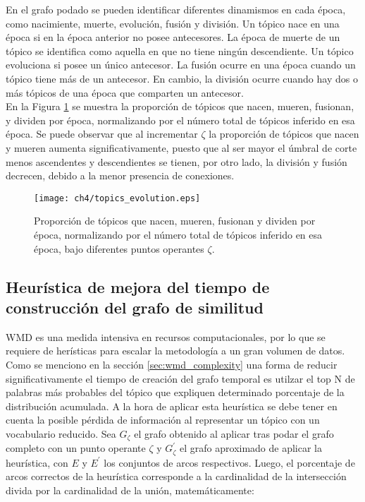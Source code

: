 En el grafo podado se pueden identificar diferentes dinamismos en cada época, como nacimiente, muerte, evolución, fusión y división. Un tópico nace en una época si en la época anterior no posee antecesores. La época de muerte de un tópico se identifica como aquella en que no tiene ningún descendiente. Un tópico evoluciona si posee un único antecesor. La fusión ocurre en una época cuando un tópico tiene más de un antecesor. En cambio, la división ocurre cuando hay dos o más tópicos de una época que comparten un antecesor.\\

En la Figura \ref{img:topics_evolution} se muestra la proporción de tópicos que nacen, mueren, fusionan, y dividen por época, normalizando por el número total de tópicos inferido en esa época. Se puede observar que al incrementar $\zeta$ la proporción de tópicos que nacen y mueren aumenta significativamente, puesto que al ser mayor el úmbral de corte menos ascendentes y descendientes se tienen, por otro lado, la división y fusión decrecen, debido a la menor presencia de conexiones.

\begin{figure}
    \centering
    \texttt{[image: ch4/topics\_evolution.eps]}
    \caption{Proporción de tópicos que nacen, mueren, fusionan y dividen por época, normalizando por el número total de tópicos inferido en esa época, bajo diferentes puntos operantes $\zeta$.}
    \label{img:topics_evolution}
\end{figure}



\subsection{Heurística de mejora del tiempo de construcción del grafo de similitud}

WMD es una medida intensiva en recursos computacionales, por lo que se requiere de herísticas para escalar la metodología a un gran volumen de datos. Como se menciono en la sección \ref{sec:wmd_complexity} una forma de reducir significativamente el tiempo de creación del grafo temporal es utilzar el top N de palabras más probables del tópico que expliquen determinado porcentaje de la distribución acumulada. A la hora de aplicar esta heurística se debe tener en cuenta la posible pérdida de información al representar un tópico con un vocabulario reducido. Sea $G_{\zeta}$ el grafo obtenido al aplicar tras podar el grafo completo con un punto operante $\zeta$ y $G^{'}_{\zeta}$ el grafo aproximado de aplicar la heurística, con $E$ y $E^{'}$ los conjuntos de arcos respectivos. Luego, el porcentaje de arcos correctos de la heurística corresponde a la cardinalidad de la intersección divida por la cardinalidad de la unión, matemáticamente:

